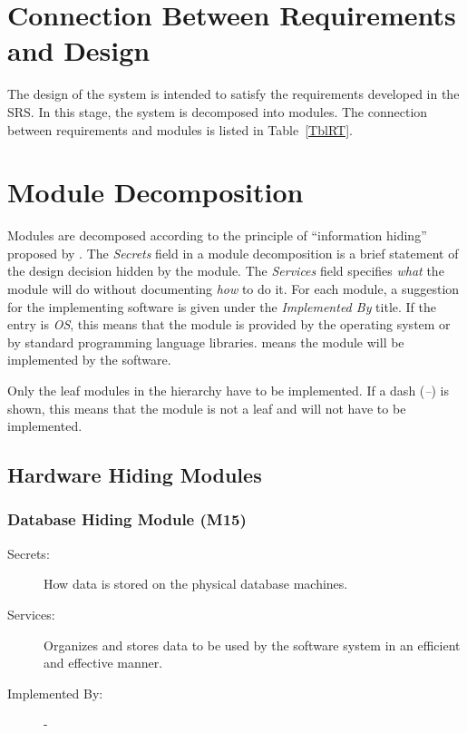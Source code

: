 \documentclass[12pt, titlepage]{article}
\begin{document}
\section{Connection Between Requirements and Design} \label{SecConnection}

The design of the system is intended to satisfy the requirements developed in
the SRS. In this stage, the system is decomposed into modules. The connection
between requirements and modules is listed in Table~\ref{TblRT}.

\section{Module Decomposition} \label{SecMD}

Modules are decomposed according to the principle of ``information hiding''
proposed by \citet{ParnasEtAl1984}. The \emph{Secrets} field in a module
decomposition is a brief statement of the design decision hidden by the
module. The \emph{Services} field specifies \emph{what} the module will do
without documenting \emph{how} to do it. For each module, a suggestion for the
implementing software is given under the \emph{Implemented By} title. If the
entry is \emph{OS}, this means that the module is provided by the operating
system or by standard programming language libraries.  \emph{\progname{}} means the
module will be implemented by the \progname{} software.

Only the leaf modules in the hierarchy have to be implemented. If a dash
(\emph{--}) is shown, this means that the module is not a leaf and will not have
to be implemented.

\subsection{Hardware Hiding Modules}

\subsubsection{Database Hiding Module (M15)}
\begin{description}
\item[Secrets:] How data is stored on the physical database machines.
\item[Services:] Organizes and stores data to be used by the software system in an efficient and effective manner.
\item[Implemented By:] -\\
\end{description}
\end{document}

